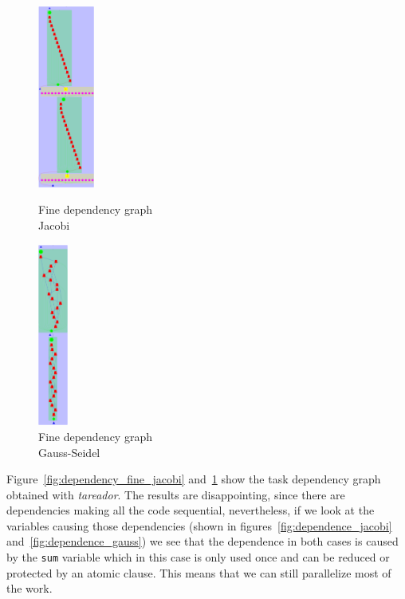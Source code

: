 \begin{figure}[H]
    \begin{minipage}{0.5\textwidth}
        \centering
        \includegraphics[height=6cm]{dependency_fine_jacobi.png}
        \caption{Fine dependency graph \\ Jacobi}%
        \label{fig:dependency_fine_jacobi}
    \end{minipage}
    \begin{minipage}{0.5\textwidth}
        \centering
        \includegraphics[height=6cm]{dependency_fine_gauss.png}
        \caption{Fine dependency graph \\ Gauss-Seidel}%
        \label{fig:dependency_fine_gauss}
    \end{minipage}
\end{figure}

Figure~\ref{fig:dependency_fine_jacobi} and~\ref{fig:dependency_fine_gauss} show the
task dependency graph obtained with \emph{tareador}. The results are disappointing, since
there are dependencies making all the code sequential, nevertheless, if we look at the
variables causing those dependencies (shown in figures~\ref{fig:dependence_jacobi}
and~\ref{fig:dependence_gauss}) we see that the dependence in both cases is caused by
the \texttt{sum} variable which in this case is only used once and can be reduced or
protected by an atomic clause. This means that we can still parallelize most of the
work.

